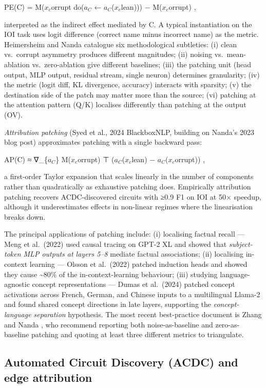 \documentclass{article}
\begin{document}
PE(C) = M(\(x_c\)orrupt \textbar{} do(\(a_C\) ← \(a_C\)(\(x_c\)lean))) − M(\(x_c\)orrupt) ,

interpreted as the indirect effect mediated by C. A typical instantiation on the IOI task uses logit difference (correct name minus incorrect name) as the metric. Heimersheim and Nanda \citet{nanda2023progressmeasuresfo} catalogue six methodological subtleties: (i) clean vs.~corrupt asymmetry produces different magnitudes; (ii) noising vs.~mean-ablation vs.~zero-ablation give different baselines; (iii) the patching unit (head output, MLP output, residual stream, single neuron) determines granularity; (iv) the metric (logit diff, KL divergence, accuracy) interacts with sparsity; (v) the destination side of the patch may matter more than the source; (vi) patching at the attention pattern (Q/K) localises differently than patching at the output (OV).

\emph{Attribution patching} (Syed et al., 2024 BlackboxNLP, building on Nanda's 2023 blog post) approximates patching with a single backward pass:

AP(C) ≈ ∇\_\{\(a_C\)\} M(\(x_c\)orrupt) ⊤ (\(a_C\)(\(x_c\)lean) − \(a_C\)(\(x_c\)orrupt)) ,

a first-order Taylor expansion that scales linearly in the number of components rather than quadratically as exhaustive patching does. Empirically attribution patching recovers ACDC-discovered circuits with ≥0.9 F1 on IOI at 50× speedup, although it underestimates effects in non-linear regimes where the linearisation breaks down.

The principal applications of patching include: (i) localising factual recall --- Meng et al.~(2022) used causal tracing on GPT-2 XL and showed that \emph{subject-token MLP outputs at layers 5--8} mediate factual associations; (ii) localising in-context learning --- Olsson et al.~(2022) patched induction heads and showed they cause \textasciitilde80\% of the in-context-learning behaviour; (iii) studying language-agnostic concept representations --- Dumas et al.~(2024) patched concept activations across French, German, and Chinese inputs to a multilingual Llama-2 and found shared concept directions in late layers, supporting the \emph{concept-language separation} hypothesis. The most recent best-practice document is Zhang and Nanda \citet{nanda2023progressmeasuresfo}, who recommend reporting both noise-as-baseline and zero-as-baseline patching and quoting at least three different metrics to triangulate.

\subsection{Automated Circuit Discovery (ACDC) and edge attribution}\label{automated-circuit-discovery-acdc-and-edge-attribution}
\end{document}

